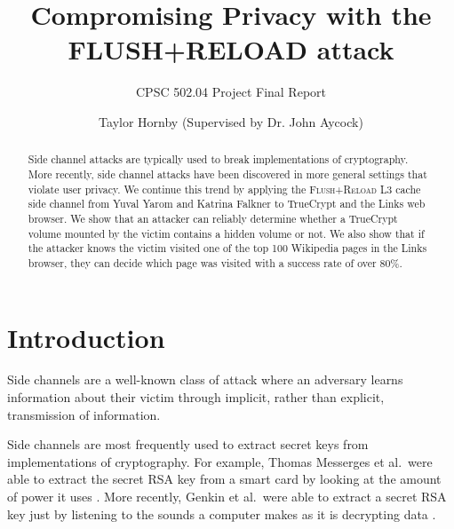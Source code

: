 \documentclass{acm_proc_article-sp}
\begin{document}

\title{Compromising Privacy with the FLUSH+RELOAD attack}
\subtitle{CPSC 502.04 Project Final Report}


\author{
\alignauthor
Taylor Hornby (Supervised by Dr. John Aycock)\\
}

\maketitle

\begin{abstract}
    Side channel attacks are typically used to break implementations of
    cryptography. More recently, side channel attacks have been discovered in
    more general settings that violate user privacy. We continue this trend by
    applying the \textsc{Flush+Reload} L3 cache side channel from Yuval Yarom and Katrina
    Falkner \cite{yarom2013flush} to TrueCrypt and the Links web browser. We
    show that an attacker can reliably determine whether a TrueCrypt volume
    mounted by the victim contains a hidden volume or not. We also show that if
    the attacker knows the victim visited one of the top 100 Wikipedia pages in
    the Links browser, they can decide which page was visited with a success
    rate of over 80\%.
\end{abstract}

\section{Introduction}
\label{sec:intro}

Side channels are a well-known class of attack where an adversary learns
information about their victim through implicit, rather than explicit,
transmission of information.

Side channels are most frequently used to extract secret keys from
implementations of cryptography. For example, Thomas Messerges et al.\ were able
to extract the secret RSA key from a smart card by looking at the amount of
power it uses \cite{messerges1999power}. More recently, Genkin et al.\ were able
to extract a secret RSA key just by listening to the sounds a computer makes as
it is decrypting data \cite{genkin2013rsa}. 
\end{document}
